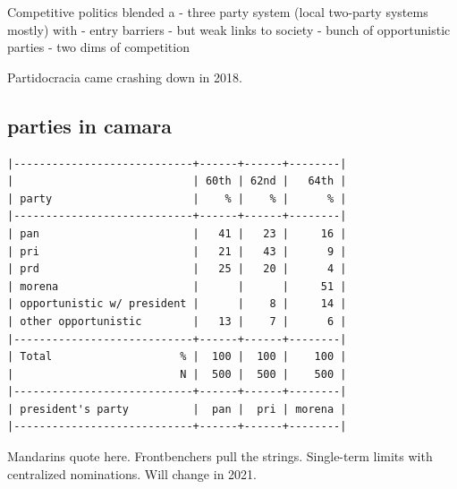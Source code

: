 \documentclass[letter,12pt]{article}
\begin{document}
Competitive politics blended a
- three party system (local two-party systems mostly) with 
- entry barriers
- but weak links to society
- bunch of opportunistic parties
- two dims of competition

Partidocracia came crashing down in 2018.

\subsection{parties in camara}

\singlespacing
\begin{footnotesize}
\begin{verbatim}
|----------------------------+------+------+--------|
|                            | 60th | 62nd |   64th |
| party                      |    % |    % |      % |
|----------------------------+------+------+--------|
| pan                        |   41 |   23 |     16 |
| pri                        |   21 |   43 |      9 |
| prd                        |   25 |   20 |      4 |
| morena                     |      |      |     51 |
| opportunistic w/ president |      |    8 |     14 |
| other opportunistic        |   13 |    7 |      6 |
|----------------------------+------+------+--------|
| Total                    % |  100 |  100 |    100 |
|                          N |  500 |  500 |    500 |
|----------------------------+------+------+--------|
| president's party          |  pan |  pri | morena |
|----------------------------+------+------+--------|
\end{verbatim}
\end{footnotesize}
\doublespacing




Mandarins quote here. Frontbenchers pull the strings. Single-term limits with centralized nominations. Will change in 2021. 

\end{document}
